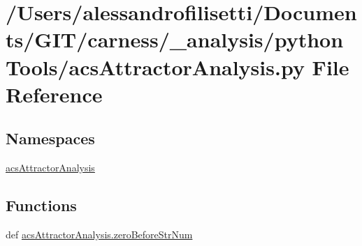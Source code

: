 \hypertarget{a00039}{\section{/\+Users/alessandrofilisetti/\+Documents/\+G\+I\+T/carness/\+\_\+analysis/python\+Tools/acs\+Attractor\+Analysis.py File Reference}
\label{a00039}
}
\subsection*{Namespaces}
\begin{DoxyCompactItemize}
\item 
 \hyperlink{a00124}{acs\+Attractor\+Analysis}
\end{DoxyCompactItemize}
\subsection*{Functions}
\begin{DoxyCompactItemize}
\item 
def \hyperlink{a00124_a97aba03091fd66dde4375e3dbffdbede}{acs\+Attractor\+Analysis.\+zero\+Before\+Str\+Num}
\end{DoxyCompactItemize}
